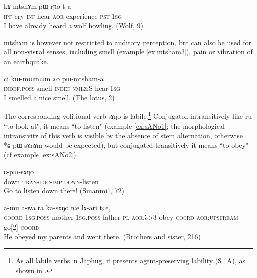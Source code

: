 \documentclass[oldfontcommands,oneside,a4paper,11pt]{article}
\newcommand{\ipa}[1]{{\phon #1}} %
\begin{document}
		
		 \begin{exe}
\ex \label{ex:mtsham2}
 \gll   	\ipa{tu-ɣɤwu}    	\ipa{ kɤ-mtshɤm}   	\ipa{pɯ-rɲo-t-a}     	 \\
 \textsc{ipf}-cry   \textsc{inf}-hear \textsc{aor}-experience-\textsc{pst}-\textsc{1sg} \\
 \glt I have already heard a wolf howling. (Wolf, 9)
\end{exe} 
 		


\ipa{mtshɤm} is however not restricted to auditory perception, but can also be used for all non-visual senses, including smell (example \ref{ex:mtsham3}), pain or vibration of an earthquake.

 \begin{exe}
\ex \label{ex:mtsham3}
\gll \ipa{tɤ-di}   	\ipa{ci}   	\ipa{kɯ-mɯ\tilderedp{}mɯm}   	\ipa{ʑo}   	\ipa{pɯ-mtsham-a}   	 \\
\textsc{indef.poss}-smell \textsc{indef} \textsc{nmlz:S}-hear-\textsc{1sg} \\
 \glt I smelled a nice smell. (The lotus, 2)
\end{exe} 

 The corresponding volitional verb \ipa{sɤŋo}	  is labile.\footnote{As all labile verbs in Japhug, it presents agent-preserving lability (S=A), as shown in \citet{jacques12demotion}. } Conjugated intransitively like \ipa{ru} ``to look at", it means ``to listen" (example \ref{ex:sANo1}; the morphological intransivity of this verb is visible by the absence of stem alternation, otherwise *\ipa{ɕ-pɯ-sɤŋɤm} would be expected), but conjugated transitively it means ``to obey" (cf example \ref{ex:sANo2}).
 
   \begin{exe}
\ex \label{ex:sANo1}
\gll  \ipa{aki}	\ipa{ɕ-pɯ-sɤŋo}  \\ 
down \textsc{transloc-imp:down}-listen \\
 \glt  Go to listen down there! (Smanmi1, 72)
\end{exe} 
% 
% 
		 \begin{exe}
\ex \label{ex:sANo2}
\gll  \ipa{tɕe}   	\ipa{a-mu}   	\ipa{a-wa}   	\ipa{ra}   	\ipa{ka-sɤŋo}   	\ipa{tɕe}   	\ipa{lɤ-ari}   	\ipa{tɕe,}   	 \\
\textsc{coord} \textsc{1sg.poss}-mother  \textsc{1sg.poss}-father \textsc{pl} \textsc{aor.3>3}-obey \textsc{coord}  \textsc{aor:upstream}-go[2] \textsc{coord}\\
 \glt He obeyed my parents and went there. (Brothers and sister, 216)
\end{exe} 
\end{document}
